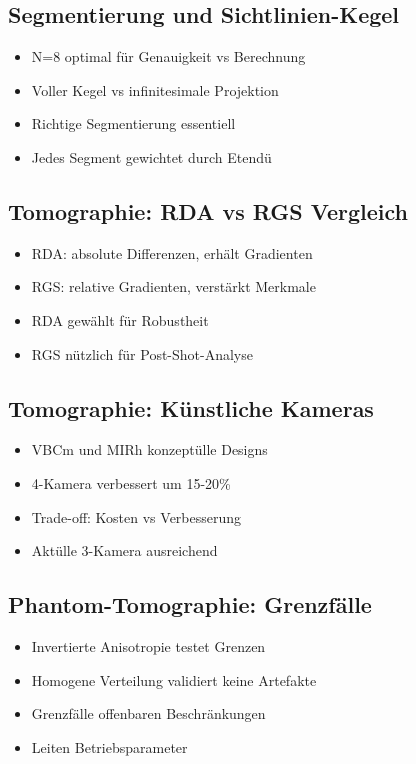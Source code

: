\documentclass[11pt,a4paper]{article}
\begin{document}
\subsection{Segmentierung und Sichtlinien-Kegel}

\begin{itemize}
\item N=8 optimal für Genauigkeit vs Berechnung
\item Voller Kegel vs infinitesimale Projektion
\item Richtige Segmentierung essentiell
\item Jedes Segment gewichtet durch Etendü
\end{itemize}

\subsection{Tomographie: RDA vs RGS Vergleich}

\begin{itemize}
\item RDA: absolute Differenzen, erhält Gradienten
\item RGS: relative Gradienten, verstärkt Merkmale
\item RDA gewählt für Robustheit
\item RGS nützlich für Post-Shot-Analyse
\end{itemize}

\subsection{Tomographie: Künstliche Kameras}

\begin{itemize}
\item VBCm und MIRh konzeptülle Designs
\item 4-Kamera verbessert um 15-20\%
\item Trade-off: Kosten vs Verbesserung
\item Aktülle 3-Kamera ausreichend
\end{itemize}

\subsection{Phantom-Tomographie: Grenzfälle}

\begin{itemize}
\item Invertierte Anisotropie testet Grenzen
\item Homogene Verteilung validiert keine Artefakte
\item Grenzfälle offenbaren Beschränkungen
\item Leiten Betriebsparameter
\end{itemize}
\end{document}
